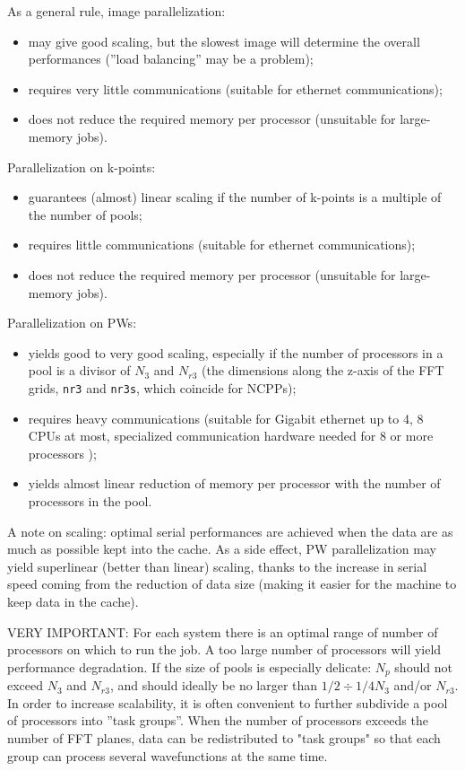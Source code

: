 \documentclass[12pt,a4paper]{article}
\begin{document}
As a general rule, image parallelization:
\begin{itemize}
\item  may give good scaling, but the slowest image will determine
the overall performances (''load balancing'' may be a problem);
\item requires very little communications (suitable for ethernet 
communications);
\item does not reduce the required memory per processor (unsuitable for 
large-memory jobs).
\end{itemize}
Parallelization on k-points:
\begin{itemize}
\item guarantees (almost) linear scaling if the number of k-points
is a multiple of the number of pools;
\item requires little communications (suitable for ethernet communications);
\item does not reduce the required memory per processor (unsuitable for 
large-memory jobs).
\end{itemize}
Parallelization on PWs:
\begin{itemize}
\item yields good to very good scaling, especially if the number of processors
in a pool is a divisor of $N_3$ and $N_{r3}$ (the dimensions along the z-axis 
of the FFT grids, \texttt{nr3} and \texttt{nr3s}, which coincide for NCPPs);
\item requires heavy communications (suitable for Gigabit ethernet up to 
4, 8 CPUs at most, specialized communication hardware needed for 8 or more
processors );
\item yields almost linear reduction of memory per processor with the number
of processors in the pool.
\end{itemize}

A note on scaling: optimal serial performances are achieved when the data are
as much as possible kept into the cache. As a side effect, PW
parallelization may yield superlinear (better than linear) scaling,
thanks to the increase in serial speed coming from the reduction of data size 
(making it easier for the machine to keep data in the cache).

VERY IMPORTANT: For each system there is an optimal range of number of processors on which to 
run the job.  A too large number of processors will yield performance 
degradation. If the size of pools is especially delicate: $N_p$ should not 
exceed $N_3$ and $N_{r3}$, and should ideally be no larger than
$1/2\div1/4 N_3$ and/or $N_{r3}$. In order to increase scalability,
it is often convenient to 
further subdivide a pool of processors into ''task groups''.
When the number of processors exceeds the number of FFT planes, 
data can be redistributed to "task groups" so that each group 
can process several wavefunctions at the same time.
\end{document}
